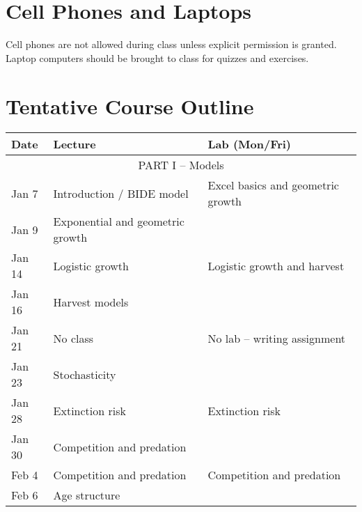 \documentclass[11pt]{article}
\begin{document}
\vspace{-5mm}
\section*{Cell Phones and Laptops}
\vspace{-5mm}
Cell phones are not allowed during class unless explicit permission is
granted. Laptop computers should be brought to class for quizzes and
exercises.  



\section*{Tentative Course Outline}
\vspace{-5mm}
\large

\begin{center}
\begin{tabular}[c]{lll}
\hline \hline
{\bf Date} & {\bf Lecture}                                   & {\bf Lab (Mon/Fri)}               \\
\hline
           \multicolumn{3}{c}{PART I -- Models}                                                  \\
\hline
Jan 7      & Introduction / BIDE model                       & Excel basics and geometric growth \\ 
Jan 9      & Exponential and geometric growth                &                                   \\ 
\hline
Jan 14     & Logistic growth                                 & Logistic growth and harvest       \\
Jan 16     & Harvest models                                 &                                    \\
\hline
Jan 21     & No class                                        & No lab -- writing assignment      \\
Jan 23     & Stochasticity                                   &                                   \\
\hline
Jan 28     & Extinction risk                                 & Extinction risk                   \\
Jan 30     & Competition and predation                       &                                   \\
\hline
Feb 4      & Competition and predation                       & Competition and predation         \\
Feb 6      & Age structure                                   &                                   \\

\end{tabular}
\end{center}
\end{document}
